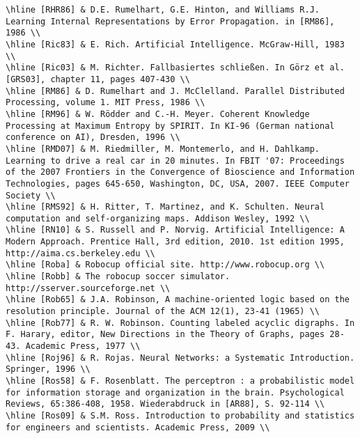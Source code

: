 \documentclass[10pt]{article}
\begin{document}
\begin{verbatim}
\hline [RHR86] & D.E. Rumelhart, G.E. Hinton, and Williams R.J. Learning Internal Representations by Error Propagation. in [RM86], 1986 \\
\hline [Ric83] & E. Rich. Artificial Intelligence. McGraw-Hill, 1983 \\
\hline [Ric03] & M. Richter. Fallbasiertes schließen. In Görz et al. [GRS03], chapter 11, pages 407-430 \\
\hline [RM86] & D. Rumelhart and J. McClelland. Parallel Distributed Processing, volume 1. MIT Press, 1986 \\
\hline [RM96] & W. Rödder and C.-H. Meyer. Coherent Knowledge Processing at Maximum Entropy by SPIRIT. In KI-96 (German national conference on AI), Dresden, 1996 \\
\hline [RMD07] & M. Riedmiller, M. Montemerlo, and H. Dahlkamp. Learning to drive a real car in 20 minutes. In FBIT '07: Proceedings of the 2007 Frontiers in the Convergence of Bioscience and Information Technologies, pages 645-650, Washington, DC, USA, 2007. IEEE Computer Society \\
\hline [RMS92] & H. Ritter, T. Martinez, and K. Schulten. Neural computation and self-organizing maps. Addison Wesley, 1992 \\
\hline [RN10] & S. Russell and P. Norvig. Artificial Intelligence: A Modern Approach. Prentice Hall, 3rd edition, 2010. 1st edition 1995, http://aima.cs.berkeley.edu \\
\hline [Roba] & Robocup official site. http://www.robocup.org \\
\hline [Robb] & The robocup soccer simulator. http://sserver.sourceforge.net \\
\hline [Rob65] & J.A. Robinson, A machine-oriented logic based on the resolution principle. Journal of the ACM 12(1), 23-41 (1965) \\
\hline [Rob77] & R. W. Robinson. Counting labeled acyclic digraphs. In F. Harary, editor, New Directions in the Theory of Graphs, pages 28-43. Academic Press, 1977 \\
\hline [Roj96] & R. Rojas. Neural Networks: a Systematic Introduction. Springer, 1996 \\
\hline [Ros58] & F. Rosenblatt. The perceptron : a probabilistic model for information storage and organization in the brain. Psychological Reviews, 65:386-408, 1958. Wiederabdruck in [AR88], S. 92-114 \\
\hline [Ros09] & S.M. Ross. Introduction to probability and statistics for engineers and scientists. Academic Press, 2009 \\

\end{verbatim}
\end{document}
